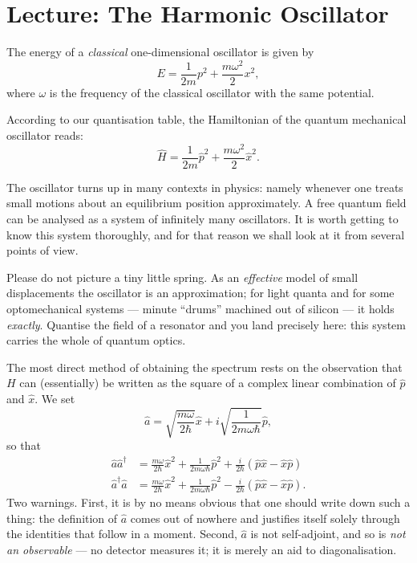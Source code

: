 
\section{Lecture: The Harmonic Oscillator}
The energy of a \emph{classical} one-dimensional oscillator is given by
\begin{equation}
	E = \frac{1}{2m}p^2 + \frac{m\omega^2}{2}x^2,
\end{equation}
where $\omega$ is the frequency of the classical oscillator with the same
potential.

According to our quantisation table, the Hamiltonian of the quantum mechanical oscillator reads:
\begin{equation}
	\widehat{H} = \frac{1}{2m}\widehat{p}^2 + \frac{m\omega^2}{2}\widehat{x}^2.
\end{equation}	


The oscillator turns up in many contexts in physics: namely whenever one treats small motions about an equilibrium position approximately. A free quantum field can be analysed as a system of infinitely
many oscillators. It is worth getting to know this system thoroughly, and for that reason we shall look at it from several points of view.

Please do not picture a tiny little spring. As an \emph{effective} model of small displacements the oscillator is an approximation; for light quanta and for some optomechanical systems --- minute ``drums'' machined out of silicon --- it holds \emph{exactly}. Quantise the field of a resonator and you land precisely here: this system carries the whole of quantum optics.

The most direct method of obtaining the spectrum rests on the observation that $H$ can (essentially) be written as the square of a complex linear combination of $\widehat{p}$ and $\widehat{x}$. We set
\begin{equation}
	\widehat{a} = \sqrt{\frac{m\omega}{2\hbar}}\widehat{x} + i \sqrt{\frac{1}{2m\omega\hbar}}\widehat{p},
\end{equation}
so that
\begin{align}
	\widehat{a} \widehat{a}^\dag &= \frac{m\omega}{2\hbar}\widehat{x}^2 + \frac{1}{2m\omega\hbar}\widehat{p}^2 + \frac{i}{2\hbar} (\widehat{p}\widehat{x} - \widehat{x}\widehat{p}) \\
	\widehat{a}^\dag \widehat{a} &= \frac{m\omega}{2\hbar}\widehat{x}^2 + \frac{1}{2m\omega\hbar}\widehat{p}^2 - \frac{i}{2\hbar} (\widehat{p}\widehat{x} - \widehat{x}\widehat{p}).
\end{align}
Two warnings. First, it is by no means obvious that one should write down such a thing: the definition of $\widehat{a}$ comes out of nowhere and justifies itself solely through the identities that follow in a moment. Second, $\widehat{a}$ is not self-adjoint, and so is \emph{not an observable} --- no detector measures it; it is merely an aid to diagonalisation.

